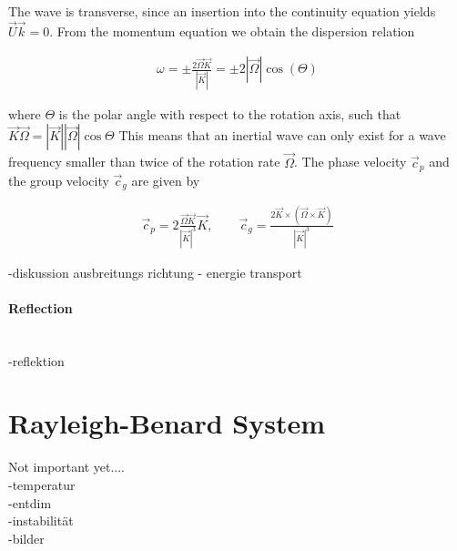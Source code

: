 The wave is transverse, since an insertion into the continuity equation yields $\vec{U}\vec{k} = 0$.
From the momentum equation we obtain the dispersion relation

\begin{align}
    \omega = \pm \frac{ 2\vec{\Omega}\vec{K}}{|\vec{K}|} = \pm 2|\vec{\Omega}|\cos(\Theta)
\end{align}

where $\Theta$ is the polar angle with respect to the rotation axis,
such that $\vec{K}\vec{\Omega} = |\vec{K}||\vec{\Omega}|\cos{\Theta}$
This means that an inertial wave can only exist for a wave frequency smaller than twice of the rotation rate $\vec{\Omega}$.
The phase velocity $\vec{c}_p$ and the group velocity $\vec{c}_g$ are given by

\begin{align}
    \vec{c}_p = 2 \frac{\vec{\Omega} \vec{K} }{|\vec{K}|^3} \vec{K}, \qquad
    \vec{c}_g = \frac{2 \vec{K} \times (\vec{\Omega} \times \vec{K})}{|\vec{K}|^3}
\end{align}

-diskussion ausbreitungs richtung
- energie transport


\paragraph{Reflection}\mbox{}\\
-reflektion

\newpage
\section{Rayleigh-Benard System}
Not important yet.... \\
-temperatur\\
-entdim\\
-instabilität\\
-bilder\\





